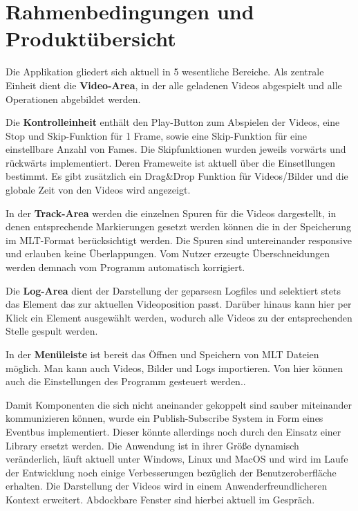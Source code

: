 \chapter{Rahmenbedingungen und Produktübersicht}

Die Applikation gliedert sich aktuell in 5 wesentliche Bereiche.
Als zentrale Einheit dient die \textbf{Video-Area}, in der alle geladenen Videos abgespielt und alle Operationen abgebildet werden.

Die \textbf{Kontrolleinheit} enthält den Play-Button zum Abspielen der Videos, eine Stop und Skip-Funktion für 1 Frame, sowie eine Skip-Funktion für eine einstellbare Anzahl von Fames. Die Skipfunktionen wurden jeweils vorwärts und rückwärts implementiert. Deren Frameweite ist aktuell über die Einsetllungen bestimmt. Es gibt zusätzlich ein Drag\&Drop Funktion für Videos/Bilder und die globale Zeit von den Videos wird angezeigt. 

In der \textbf{Track-Area} werden die einzelnen Spuren für die Videos dargestellt, in denen entsprechende Markierungen gesetzt werden können die in der Speicherung im MLT-Format berücksichtigt werden. Die Spuren sind untereinander responsive und erlauben keine Überlappungen. Vom Nutzer erzeugte Überschneidungen werden demnach vom Programm automatisch korrigiert.

Die \textbf{Log-Area} dient der Darstellung der geparsesn Logfiles und selektiert stets das Element das zur aktuellen Videoposition passt. Darüber hinaus kann hier per Klick ein Element ausgewählt werden, wodurch alle Videos zu der entsprechenden Stelle gespult werden.

In der \textbf{Menüleiste} ist bereit das Öffnen und Speichern von MLT Dateien möglich. Man kann auch Videos, Bilder und Logs importieren. Von hier können auch die Einstellungen des Programm gesteuert werden.. 

Damit Komponenten die sich nicht aneinander gekoppelt sind sauber miteinander kommunizieren können, wurde ein Publish-Subscribe System in Form eines Eventbus implementiert. Dieser könnte allerdings noch durch den Einsatz einer Library ersetzt werden.
Die Anwendung ist in ihrer Größe dynamisch veränderlich, läuft aktuell unter Windows, Linux und MacOS und wird im Laufe der Entwicklung noch einige Verbesserungen bezüglich der Benutzeroberfläche erhalten. 
Die Darstellung der Videos wird in einem Anwenderfreundlicheren Kontext erweitert. Abdockbare Fenster sind hierbei aktuell im Gespräch.
